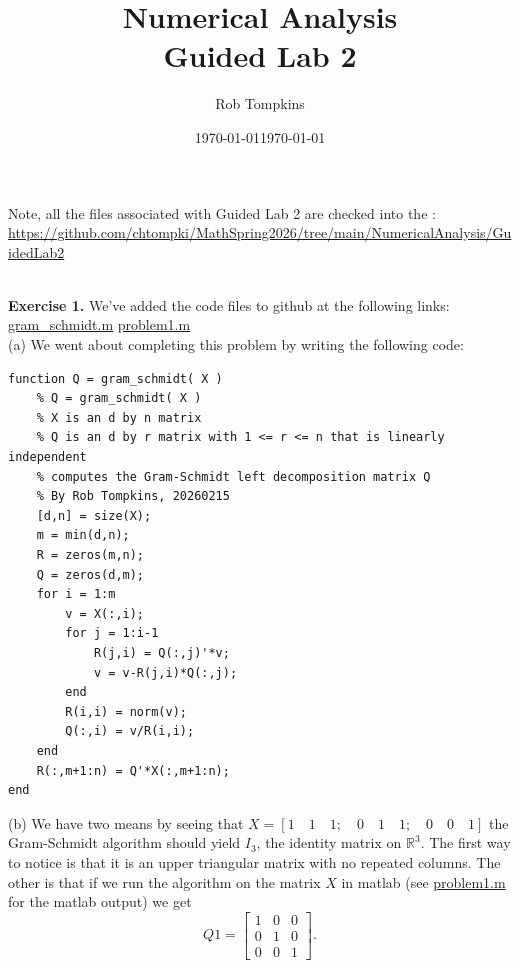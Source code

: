 \documentclass[12pt]{amsart}
\title{Numerical Analysis\\Guided Lab 2}
\author{Rob Tompkins}
\date{\today}
\begin{document}
    \maketitle
    \date{\today}
    \begin{onehalfspace}
        Note, all the files associated with Guided Lab 2 are checked into the : \\
        \underline{https://github.com/chtompki/MathSpring2026/tree/main/NumericalAnalysis/GuidedLab2}

        \qquad\\
        \textbf{Exercise 1.} We've added the code files to github at the following links:
        \href{https://github.com/chtompki/MathSpring2026/blob/main/NumericalAnalysis/GuidedLab2/gram_schmidt.m}{gram\_schmidt.m}
        \href{https://github.com/chtompki/MathSpring2026/blob/main/NumericalAnalysis/GuidedLab2/problem1.m}{problem1.m}
        \\
        (a) We went about completing this problem by writing the following code:
        \begin{tiny}
        \begin{verbatim}
function Q = gram_schmidt( X )
    % Q = gram_schmidt( X )
    % X is an d by n matrix
    % Q is an d by r matrix with 1 <= r <= n that is linearly independent
    % computes the Gram-Schmidt left decomposition matrix Q
    % By Rob Tompkins, 20260215
    [d,n] = size(X);
    m = min(d,n);
    R = zeros(m,n);
    Q = zeros(d,m);
    for i = 1:m
        v = X(:,i);
        for j = 1:i-1
            R(j,i) = Q(:,j)'*v;
            v = v-R(j,i)*Q(:,j);
        end
        R(i,i) = norm(v);
        Q(:,i) = v/R(i,i);
    end
    R(:,m+1:n) = Q'*X(:,m+1:n);
end
        \end{verbatim}
        \end{tiny}

        (b) We have two means by seeing that $X = [1\quad 1\quad 1;\quad 0\quad 1\quad 1; \quad 0\quad 0\quad 1]$ the
        Gram-Schmidt algorithm should yield $I_3$, the identity matrix on $\mathbb{R}^3$.
        The first way to notice is that it is an upper triangular matrix with no repeated columns. The other is that if we
        run the algorithm on the matrix $X$ in matlab (see \href{https://github.com/chtompki/MathSpring2026/blob/main/NumericalAnalysis/GuidedLab2/problem1.m}{problem1.m} for the matlab output) we get
        \begin{displaymath}
            Q1 = \left[\begin{matrix}
                           1 & 0 & 0\\
                           0 & 1 & 0\\
                           0 & 0 & 1
            \end{matrix}\right].
        \end{displaymath}


\end{onehalfspace}
\end{document}
